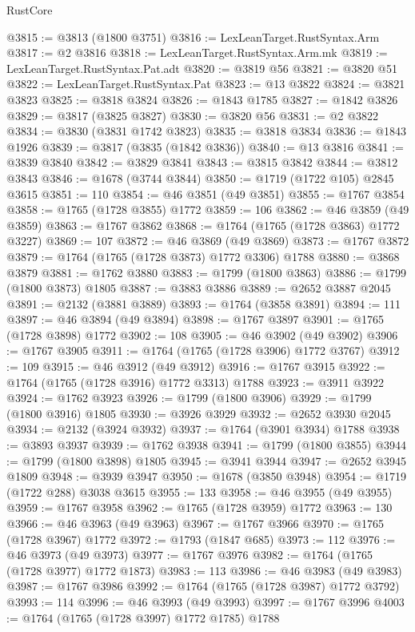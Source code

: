 \begin{lexlean}{RustCore}
\begin{coremodule}
@3815 := @3813 (@1800 @3751)
@3816 := LexLeanTarget.RustSyntax.Arm
@3817 := @2 @3816
@3818 := LexLeanTarget.RustSyntax.Arm.mk
@3819 := LexLeanTarget.RustSyntax.Pat.adt
@3820 := @3819 @56
@3821 := @3820 @51
@3822 := LexLeanTarget.RustSyntax.Pat
@3823 := @13 @3822
@3824 := @3821 @3823
@3825 := @3818 @3824
@3826 := @1843 @1785
@3827 := @1842 @3826
@3829 := @3817 (@3825 @3827)
@3830 := @3820 @56
@3831 := @2 @3822
@3834 := @3830 (@3831 @1742 @3823)
@3835 := @3818 @3834
@3836 := @1843 @1926
@3839 := @3817 (@3835 (@1842 @3836))
@3840 := @13 @3816
@3841 := @3839 @3840
@3842 := @3829 @3841
@3843 := @3815 @3842
@3844 := @3812 @3843
@3846 := @1678 (@3744 @3844)
@3850 := @1719 (@1722 @105) @2845 @3615
@3851 := 110
@3854 := @46 @3851 (@49 @3851)
@3855 := @1767 @3854
@3858 := @1765 (@1728 @3855) @1772
@3859 := 106
@3862 := @46 @3859 (@49 @3859)
@3863 := @1767 @3862
@3868 := @1764 (@1765 (@1728 @3863) @1772 @3227)
@3869 := 107
@3872 := @46 @3869 (@49 @3869)
@3873 := @1767 @3872
@3879 := @1764 (@1765 (@1728 @3873) @1772 @3306) @1788
@3880 := @3868 @3879
@3881 := @1762 @3880
@3883 := @1799 (@1800 @3863)
@3886 := @1799 (@1800 @3873) @1805
@3887 := @3883 @3886
@3889 := @2652 @3887 @2045
@3891 := @2132 (@3881 @3889)
@3893 := @1764 (@3858 @3891)
@3894 := 111
@3897 := @46 @3894 (@49 @3894)
@3898 := @1767 @3897
@3901 := @1765 (@1728 @3898) @1772
@3902 := 108
@3905 := @46 @3902 (@49 @3902)
@3906 := @1767 @3905
@3911 := @1764 (@1765 (@1728 @3906) @1772 @3767)
@3912 := 109
@3915 := @46 @3912 (@49 @3912)
@3916 := @1767 @3915
@3922 := @1764 (@1765 (@1728 @3916) @1772 @3313) @1788
@3923 := @3911 @3922
@3924 := @1762 @3923
@3926 := @1799 (@1800 @3906)
@3929 := @1799 (@1800 @3916) @1805
@3930 := @3926 @3929
@3932 := @2652 @3930 @2045
@3934 := @2132 (@3924 @3932)
@3937 := @1764 (@3901 @3934) @1788
@3938 := @3893 @3937
@3939 := @1762 @3938
@3941 := @1799 (@1800 @3855)
@3944 := @1799 (@1800 @3898) @1805
@3945 := @3941 @3944
@3947 := @2652 @3945 @1809
@3948 := @3939 @3947
@3950 := @1678 (@3850 @3948)
@3954 := @1719 (@1722 @288) @3038 @3615
@3955 := 133
@3958 := @46 @3955 (@49 @3955)
@3959 := @1767 @3958
@3962 := @1765 (@1728 @3959) @1772
@3963 := 130
@3966 := @46 @3963 (@49 @3963)
@3967 := @1767 @3966
@3970 := @1765 (@1728 @3967) @1772
@3972 := @1793 (@1847 @685)
@3973 := 112
@3976 := @46 @3973 (@49 @3973)
@3977 := @1767 @3976
@3982 := @1764 (@1765 (@1728 @3977) @1772 @1873)
@3983 := 113
@3986 := @46 @3983 (@49 @3983)
@3987 := @1767 @3986
@3992 := @1764 (@1765 (@1728 @3987) @1772 @3792)
@3993 := 114
@3996 := @46 @3993 (@49 @3993)
@3997 := @1767 @3996
@4003 := @1764 (@1765 (@1728 @3997) @1772 @1785) @1788

\end{coremodule}
\end{lexlean}
